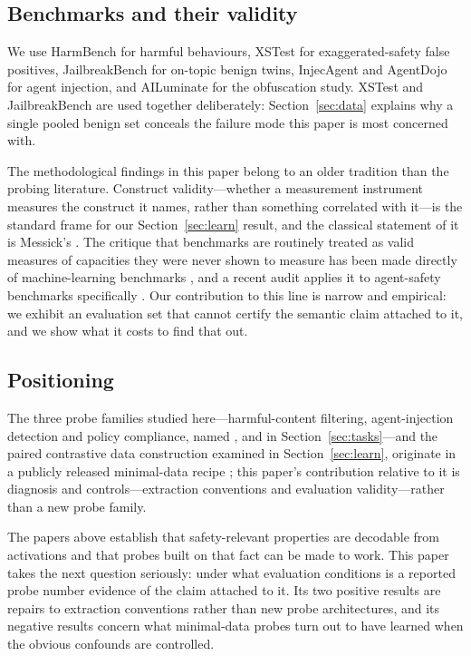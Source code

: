 \subsection{Benchmarks and their validity}

We use HarmBench \cite{mazeika2024harmbench} for harmful behaviours, XSTest \cite{rottger2024xstest} for
exaggerated-safety false positives, JailbreakBench \cite{chao2024jailbreakbench} for on-topic benign twins,
InjecAgent \cite{zhan2024injecagent} and AgentDojo \cite{debenedetti2024agentdojo} for agent injection, and AILuminate
\cite{mlcommons2025ailuminate} for the obfuscation study. XSTest and JailbreakBench are used together deliberately:
Section~\ref{sec:data} explains why a single pooled benign set conceals the failure mode this paper is most concerned
with.

The methodological findings in this paper belong to an older tradition than the probing literature. Construct
validity---whether a measurement instrument measures the construct it names, rather than something correlated with
it---is the standard frame for our Section~\ref{sec:learn} result, and the classical statement of it is Messick's
\cite{messick1995validity}. The critique that benchmarks are routinely treated as valid measures of
capacities they were never shown to measure has been made directly of machine-learning benchmarks
\cite{raji2021benchmark}, and a recent audit applies it to agent-safety benchmarks specifically
\cite{agentsafetyaudit2026}. Our contribution to this line is narrow and empirical: we exhibit an evaluation set that
cannot certify the semantic claim attached to it, and we show what it costs to find that out.

\subsection{Positioning}

The three probe families studied here---harmful-content filtering, agent-injection detection and policy compliance,
named \af{}, \aag{} and \apc{} in Section~\ref{sec:tasks}---and the paired contrastive data construction examined in
Section~\ref{sec:learn}, originate in a publicly released minimal-data recipe \cite{messenger2026aase}; this paper's
contribution relative to it is diagnosis and controls---extraction conventions and evaluation validity---rather than a
new probe family.

The papers above establish that safety-relevant properties are decodable from activations and that probes built on
that fact can be made to work. This paper takes the next question seriously: under what evaluation conditions is a
reported probe number evidence of the claim attached to it. Its two positive results are repairs to extraction
conventions rather than new probe architectures, and its negative results concern what minimal-data probes turn out to
have learned when the obvious confounds are controlled.

